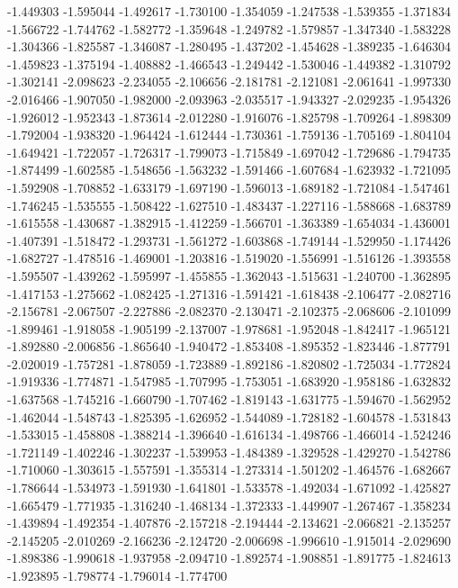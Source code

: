 -1.449303
-1.595044
-1.492617
-1.730100
-1.354059
-1.247538
-1.539355
-1.371834
-1.566722
-1.744762
-1.582772
-1.359648
-1.249782
-1.579857
-1.347340
-1.583228
-1.304366
-1.825587
-1.346087
-1.280495
-1.437202
-1.454628
-1.389235
-1.646304
-1.459823
-1.375194
-1.408882
-1.466543
-1.249442
-1.530046
-1.449382
-1.310792
-1.302141
-2.098623
-2.234055
-2.106656
-2.181781
-2.121081
-2.061641
-1.997330
-2.016466
-1.907050
-1.982000
-2.093963
-2.035517
-1.943327
-2.029235
-1.954326
-1.926012
-1.952343
-1.873614
-2.012280
-1.916076
-1.825798
-1.709264
-1.898309
-1.792004
-1.938320
-1.964424
-1.612444
-1.730361
-1.759136
-1.705169
-1.804104
-1.649421
-1.722057
-1.726317
-1.799073
-1.715849
-1.697042
-1.729686
-1.794735
-1.874499
-1.602585
-1.548656
-1.563232
-1.591466
-1.607684
-1.623932
-1.721095
-1.592908
-1.708852
-1.633179
-1.697190
-1.596013
-1.689182
-1.721084
-1.547461
-1.746245
-1.535555
-1.508422
-1.627510
-1.483437
-1.227116
-1.588668
-1.683789
-1.615558
-1.430687
-1.382915
-1.412259
-1.566701
-1.363389
-1.654034
-1.436001
-1.407391
-1.518472
-1.293731
-1.561272
-1.603868
-1.749144
-1.529950
-1.174426
-1.682727
-1.478516
-1.469001
-1.203816
-1.519020
-1.556991
-1.516126
-1.393558
-1.595507
-1.439262
-1.595997
-1.455855
-1.362043
-1.515631
-1.240700
-1.362895
-1.417153
-1.275662
-1.082425
-1.271316
-1.591421
-1.618438
-2.106477
-2.082716
-2.156781
-2.067507
-2.227886
-2.082370
-2.130471
-2.102375
-2.068606
-2.101099
-1.899461
-1.918058
-1.905199
-2.137007
-1.978681
-1.952048
-1.842417
-1.965121
-1.892880
-2.006856
-1.865640
-1.940472
-1.853408
-1.895352
-1.823446
-1.877791
-2.020019
-1.757281
-1.878059
-1.723889
-1.892186
-1.820802
-1.725034
-1.772824
-1.919336
-1.774871
-1.547985
-1.707995
-1.753051
-1.683920
-1.958186
-1.632832
-1.637568
-1.745216
-1.660790
-1.707462
-1.819143
-1.631775
-1.594670
-1.562952
-1.462044
-1.548743
-1.825395
-1.626952
-1.544089
-1.728182
-1.604578
-1.531843
-1.533015
-1.458808
-1.388214
-1.396640
-1.616134
-1.498766
-1.466014
-1.524246
-1.721149
-1.402246
-1.302237
-1.539953
-1.484389
-1.329528
-1.429270
-1.542786
-1.710060
-1.303615
-1.557591
-1.355314
-1.273314
-1.501202
-1.464576
-1.682667
-1.786644
-1.534973
-1.591930
-1.641801
-1.533578
-1.492034
-1.671092
-1.425827
-1.665479
-1.771935
-1.316240
-1.468134
-1.372333
-1.449907
-1.267467
-1.358234
-1.439894
-1.492354
-1.407876
-2.157218
-2.194444
-2.134621
-2.066821
-2.135257
-2.145205
-2.010269
-2.166236
-2.124720
-2.006698
-1.996610
-1.915014
-2.029690
-1.898386
-1.990618
-1.937958
-2.094710
-1.892574
-1.908851
-1.891775
-1.824613
-1.923895
-1.798774
-1.796014
-1.774700
